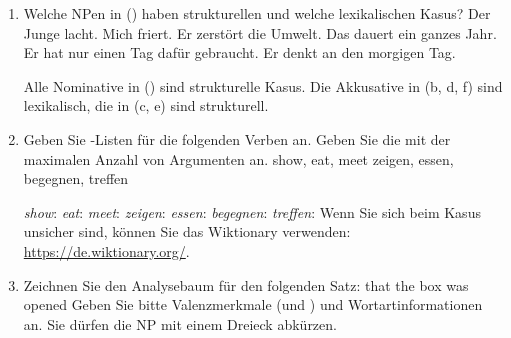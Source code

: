 \begin{enumerate}
\item Welche NPen in () haben strukturellen und welche lexikalischen Kasus?
\eal
\ex Der Junge lacht.
\ex Mich friert.
\ex Er zerstört die Umwelt.
\ex Das dauert ein ganzes Jahr.
\ex Er hat nur einen Tag dafür gebraucht.
\ex Er denkt an den morgigen Tag.
\zl

Alle Nominative in () sind strukturelle Kasus. Die Akkusative in (b, d, f) sind lexikalisch,
die in (c, e) sind strukturell.

\item Geben Sie \argst-Listen für die folgenden Verben an. Geben Sie die \argstl mit der maximalen Anzahl von Argumenten an.
\eal
\ex show, eat, meet \english
\ex zeigen, essen, begegnen, treffen \german
\zl

\eal
\ex \emph{show}: 
\ex \emph{eat}: 
\ex \emph{meet}: 
\zl
\eal
\ex \emph{zeigen}: 
\ex \emph{essen}: 
\ex \emph{begegnen}: 
\ex \emph{treffen}: 
\zl
Wenn Sie sich beim Kasus unsicher sind, können Sie das
  Wiktionary verwenden: \url{https://de.wiktionary.org/}.

\item Zeichnen Sie den Analysebaum für den folgenden Satz:
\ea
that the box was opened
\z
Geben Sie bitte Valenzmerkmale (\spr und \comps) und Wortartinformationen an. Sie dürfen
die NP mit einem Dreieck abkürzen.



\end{enumerate}
